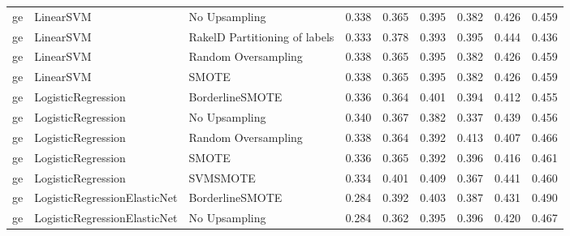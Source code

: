 \begin{tabular}{lllllllll}
      ge &                       LinearSVM &                 No Upsampling & 0.338 &                     0.365 &                 0.395 &                  0.382 &                                   0.426 &     0.459 \\
      ge &                       LinearSVM & RakelD Partitioning of labels & 0.333 &                     0.378 &                 0.393 &                  0.395 &                                   0.444 &     0.436 \\
      ge &                       LinearSVM &           Random Oversampling & 0.338 &                     0.365 &                 0.395 &                  0.382 &                                   0.426 &     0.459 \\
      ge &                       LinearSVM &                         SMOTE & 0.338 &                     0.365 &                 0.395 &                  0.382 &                                   0.426 &     0.459 \\
      ge &              LogisticRegression &               BorderlineSMOTE & 0.336 &                     0.364 &                 0.401 &                  0.394 &                                   0.412 &     0.455 \\
      ge &              LogisticRegression &                 No Upsampling & 0.340 &                     0.367 &                 0.382 &                  0.337 &                                   0.439 &     0.456 \\
      ge &              LogisticRegression &           Random Oversampling & 0.338 &                     0.364 &                 0.392 &                  0.413 &                                   0.407 &     0.466 \\
      ge &              LogisticRegression &                         SMOTE & 0.336 &                     0.365 &                 0.392 &                  0.396 &                                   0.416 &     0.461 \\
      ge &              LogisticRegression &                      SVMSMOTE & 0.334 &                     0.401 &                 0.409 &                  0.367 &                                   0.441 &     0.460 \\
      ge &    LogisticRegressionElasticNet &               BorderlineSMOTE & 0.284 &                     0.392 &                 0.403 &                  0.387 &                                   0.431 &     0.490 \\
      ge &    LogisticRegressionElasticNet &                 No Upsampling & 0.284 &                     0.362 &                 0.395 &                  0.396 &                                   0.420 &     0.467 \\

\end{tabular}
